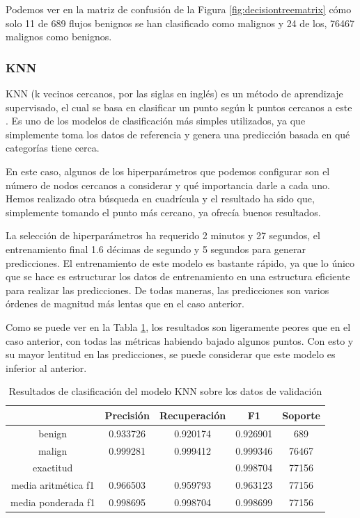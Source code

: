 Podemos ver en la matriz de confusión de la Figura \ref{fig:decisiontreematrix} cómo solo 11 de 689 flujos benignos se han clasificado como malignos y 24 de los, 76467 malignos como benignos.

\subsubsection{KNN}

KNN (k vecinos cercanos, por las siglas en inglés) es un método de aprendizaje supervisado, el cual se basa en clasificar un punto según k puntos cercanos a este \cite{ibmknn}. Es uno de los modelos de clasificación más simples utilizados, ya que simplemente toma los datos de referencia y genera una predicción basada en qué categorías tiene cerca.

En este caso, algunos de los hiperparámetros que podemos configurar son el número de nodos cercanos a considerar y qué importancia darle a cada uno. Hemos realizado otra búsqueda en cuadrícula y el resultado ha sido que, simplemente tomando el punto más cercano, ya ofrecía buenos resultados.

La selección de hiperparámetros ha requerido 2 minutos y 27 segundos, el entrenamiento final 1.6 décimas de segundo y 5 segundos para generar predicciones. El entrenamiento de este modelo es bastante rápido, ya que lo único que se hace es estructurar los datos de entrenamiento en una estructura eficiente para realizar las predicciones. De todas maneras, las predicciones son varios órdenes de magnitud más lentas que en el caso anterior.

Como se puede ver en la Tabla \ref{table:knnresults}, los resultados son ligeramente peores que en el caso anterior, con todas las métricas habiendo bajado algunos puntos. Con esto y su mayor lentitud en las predicciones, se puede considerar que este modelo es inferior al anterior.

\begin{table}[H]
    \begin{center}
        \begin{tabular}{|c | c c c | c |} 
            \hline
            & \textbf{Precisión} & \textbf{Recuperación} & \textbf{F1}  & \textbf{Soporte} \\
            \hline
            benign               & 0.933726 & 0.920174 & 0.926901  &   689 \\
            malign               & 0.999281 & 0.999412 & 0.999346  & 76467 \\
            \hline
            exactitud            &          &          & 0.998704  & 77156 \\
            media aritmética f1  & 0.966503 & 0.959793 & 0.963123  & 77156 \\
            media ponderada f1   & 0.998695 & 0.998704 & 0.998699  & 77156 \\
            \hline
        \end{tabular}
    \end{center}
    \caption{Resultados de clasificación del modelo KNN sobre los datos de validación}
    \label{table:knnresults}
\end{table}

